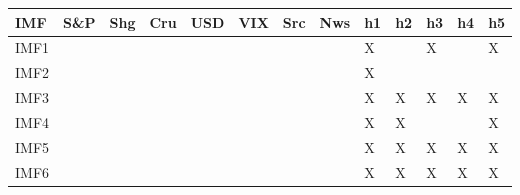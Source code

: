 {\tiny\setlength{\tabcolsep}{1pt}\begin{tabular}{lllllllllllll} \toprule
IMF & S\&P & Shg & Cru & USD & VIX & Src & Nws & h1 & h2 & h3 & h4 & h5 \\ \midrule
IMF1 & & & & & & & & X & & X & & X \\ 
IMF2 & & & & & & & & X & & & & \\ 
IMF3 & & & & & & & & X & X & X & X & X \\ 
IMF4 & & & & & & & & X & X & & & X \\ 
IMF5 & & & & & & & & X & X & X & X & X \\ 
IMF6 & & & & & & & & X & X & X & X & X \\ 
\bottomrule \end{tabular}}
